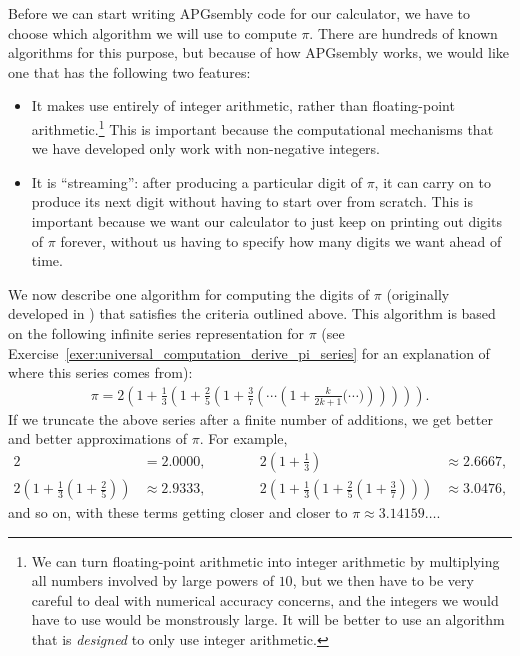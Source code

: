 Before we can start writing APGsembly code for our calculator, we have to choose which algorithm we will use to compute $\pi$. There are hundreds of known algorithms for this purpose, but because of how APGsembly works, we would like one that has the following two features:\smallskip

\begin{itemize}
	\item It makes use entirely of integer arithmetic, rather than floating-point arithmetic.\footnote{We can turn floating-point arithmetic into integer arithmetic by multiplying all numbers involved by large powers of $10$, but we then have to be very careful to deal with numerical accuracy concerns, and the integers we would have to use would be monstrously large. It will be better to use an algorithm that is \emph{designed} to only use integer arithmetic.} This is important because the computational mechanisms that we have developed only work with non-negative integers.\smallskip
	
	\item It is ``streaming'': after producing a particular digit of $\pi$, it can carry on to produce its next digit without having to start over from scratch. This is important because we want our calculator to just keep on printing out digits of $\pi$ forever, without us having to specify how many digits we want ahead of time.\smallskip
\end{itemize}

We now describe one algorithm for computing the digits of $\pi$ (originally developed in \cite{Gib06}) that satisfies the criteria outlined above. This algorithm is based on the following infinite series representation for $\pi$ (see Exercise~\ref{exer:universal_computation_derive_pi_series} for an explanation of where this series comes from):
\begin{align}\label{eq:pi_series}
	\pi = 2\left(1 + \frac{1}{3}\left( 1 + \frac{2}{5}\left( 1 + \frac{3}{7}\left( \cdots \left( 1 + \frac{k}{2k+1}\Big( \cdots \Big) \right)\right)\right)\right)\right).
\end{align}
If we truncate the above series after a finite number of additions, we get better and better approximations of $\pi$. For example,
\begin{equation}\label{eq:pi_approx}
\begin{alignedat}{2}
2 & = 2.0000, \qquad \quad {} & 2\left(1 + \frac{1}{3}\right) & \approx 2.6667, \\
2\left(1 + \frac{1}{3}\left(1 + \frac{2}{5}\right)\right) & \approx 2.9333, \qquad \quad {} & 2\left(1 + \frac{1}{3}\left(1 + \frac{2}{5}\left(1 + \frac{3}{7}\right)\right)\right) & \approx 3.0476,
\end{alignedat}
\end{equation}
and so on, with these terms getting closer and closer to $\pi \approx 3.14159\ldots$.


